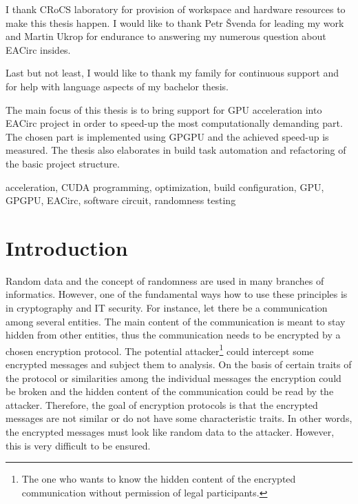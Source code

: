 \documentclass[12pt,oneside]{fithesis2}
\begin{document}
\FrontMatter
	\ThesisTitlePage
	\begin{ThesisDeclaration}
		\DeclarationText
		\AdvisorName
	\end{ThesisDeclaration}
	\begin{ThesisThanks}
		I thank CRoCS laboratory for provision of workspace and hardware resources to make this thesis happen. I would like to thank Petr Švenda for leading my work and Martin Ukrop for endurance to answering my numerous question about EACirc insides.
		
		\bigskip
		
		\noindent
		Last but not least, I would like to thank my family for continuous support and for help with language aspects of my bachelor thesis.
	\end{ThesisThanks}
	\begin{ThesisAbstract}
		The main focus of this thesis is to bring support for GPU acceleration into EACirc project in order to speed-up the most computationally demanding part. The chosen part is implemented using GPGPU and the achieved speed-up is measured. The thesis also elaborates in build task automation and refactoring of the basic project structure.
	\end{ThesisAbstract}
	\begin{ThesisKeyWords}
		acceleration, CUDA programming, optimization, build configuration, GPU, GPGPU, EACirc, software circuit, randomness testing
	\end{ThesisKeyWords}
	\tableofcontents

\MainMatter
\chapter{Introduction}
Random data and the concept of randomness are used in many branches of informatics. However, one of the fundamental ways how to use these principles is in cryptography and IT security. For instance, let there be a communication among several entities. The main content of the communication is meant to stay hidden from other entities, thus the communication needs to be encrypted by a chosen encryption protocol. The potential attacker\footnote{The one who wants to know the hidden content of the encrypted communication without permission of legal participants.} could intercept some encrypted messages and subject them to analysis. On the basis of certain traits of the protocol or similarities among the individual messages the encryption could be broken and the hidden content of the communication could be read by the attacker. Therefore, the goal of encryption protocols is that the encrypted messages are not similar or do not have some characteristic traits. In other words, the encrypted messages must look like random data to the attacker. However, this is very difficult to be ensured.
\end{document}
